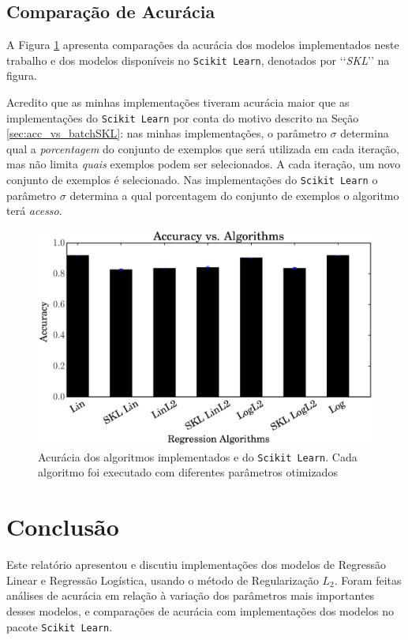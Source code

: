 \documentclass[a4paper, 12pt]{article}
\begin{document}
\newpage
\subsection{Comparação de Acurácia}

A Figura \ref{fig:algorithm} apresenta comparações
da acurácia dos modelos implementados neste trabalho
e dos modelos disponíveis no \texttt{Scikit Learn},
denotados por \lq\lq{}\textit{SKL}\rq\rq{} na figura.

Acredito que as minhas implementações tiveram acurácia
maior que as implementações do \texttt{Scikit Learn} por
conta do motivo descrito na Seção \ref{sec:acc_vs_batchSKL}:
nas minhas implementações, o parâmetro $\sigma$ determina
qual a \textit{porcentagem} do conjunto de exemplos que
será utilizada em cada iteração, mas não limita \textit{quais}
exemplos podem ser selecionados. A cada iteração, um novo
conjunto de exemplos é selecionado. Nas implementações do
\texttt{Scikit Learn} o parâmetro $\sigma$ determina a qual
porcentagem do conjunto de exemplos o algoritmo terá
\textit{acesso}.

\begin{figure}[htpb]
    \centering
    \includegraphics[width=.8\textwidth]{acc_vs_algorithm}
    \caption{Acurácia dos algoritmos implementados e do
    \texttt{Scikit Learn}. Cada algoritmo foi executado
    com diferentes parâmetros otimizados}
    \label{fig:algorithm}
\end{figure}

\newpage
\section{Conclusão} \label{sec:concl}

Este relatório apresentou e discutiu implementações dos modelos de Regressão
Linear e Regressão Logística, usando o método de Regularização $L_2$. Foram
feitas análises de acurácia em relação à variação dos parâmetros mais
importantes desses modelos, e comparações de acurácia com implementações dos
modelos no pacote \texttt{Scikit Learn}.
\end{document}
